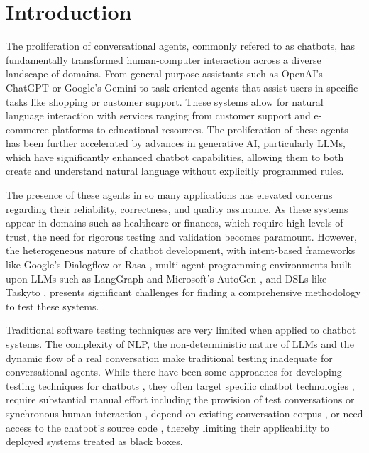 
\chapter{Introduction}\label{chapter:introduction}


The proliferation of conversational agents, commonly refered to as chatbots,
has fundamentally transformed human-computer interaction
across a diverse landscape of domains.
From general-purpose assistants such as OpenAI's ChatGPT \autocite{ChatGPT} or Google's Gemini \autocite{GoogleGemini}
to task-oriented agents that assist users in specific tasks like shopping or customer support.
These systems allow for natural language interaction with services ranging from customer support and e-commerce platforms to educational resources.
The proliferation of these agents has been further accelerated by advances in generative \ac{AI},
particularly \acp{LLM},
which have significantly enhanced chatbot capabilities, allowing them to both create and understand natural language without explicitly programmed rules.

The presence of these agents in so many applications has elevated concerns regarding their reliability, correctness, and quality assurance.
As these systems appear in domains such as healthcare or finances, which require high levels of trust, the need for rigorous testing and validation becomes paramount.
However, the heterogeneous nature of chatbot development,
with intent-based frameworks like Google's Dialogflow \autocite{Dialogflow} or Rasa \autocite{Rasa2020},
multi-agent programming environments built upon LLMs such as LangGraph \autocite{LangGraph} and Microsoft's AutoGen \autocite{AutoGen},
and \acp{DSL} like Taskyto \autocite{sanchezcuadradoAutomatingDevelopmentTaskoriented2024},
presents significant challenges for finding a comprehensive methodology to test these systems.

Traditional software testing techniques are very limited when applied to chatbot systems.
The complexity of \ac{NLP}, the non-deterministic nature of \acp{LLM} and the dynamic flow of a real conversation make traditional testing inadequate for conversational agents.
While there have been some approaches for developing testing techniques for chatbots \cite{cuadradoIntegratingStaticQuality2024, canizaresMeasuringClusteringHeterogeneous2024},
they often target specific chatbot technologies \autocite{RasaTest2025},
require substantial manual effort including the provision of test conversations \autocite{CyaraBotium, RasaTest2025}
or synchronous human interaction \autocite{renEvaluationTechniquesChatbot2019},
depend on existing conversation corpus \autocite{vasconcelosBottesterTestingConversational2017},
or need access to the chatbot's source code \autocite{canizaresCoveragebasedStrategiesAutomated2024, gomez-abajoMutationTestingTaskOriented2024, urricoMutaBotMutationTesting2024},
thereby limiting their applicability to deployed systems treated as black boxes.

